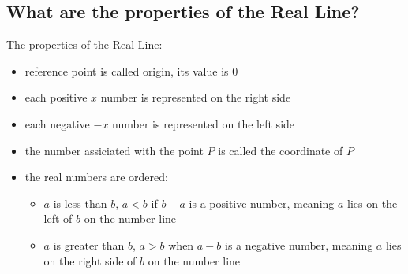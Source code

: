 \subsection{What are the properties of the Real Line?}

The properties of the Real Line:

\begin{itemize}
    \item reference point is called origin, its value is $0$
    \item each positive $x$ number is represented on the right side
    \item each negative $-x$ number is represented on the left side
    \item the number assiciated with the point $P$ is called the coordinate of
        $P$
    \item the real numbers are ordered:
    \begin{itemize}
        \item $a$ is less than $b$,  $a < b$ if $b - a$ is a positive number,
            meaning $a$ lies on the left of $b$ on the number line
        \item $a$ is greater than $b$, $a > b$ when $a - b$ is a negative
            number, meaning $a$ lies on the right side of $b$ on the number line
    \end{itemize}
\end{itemize}
